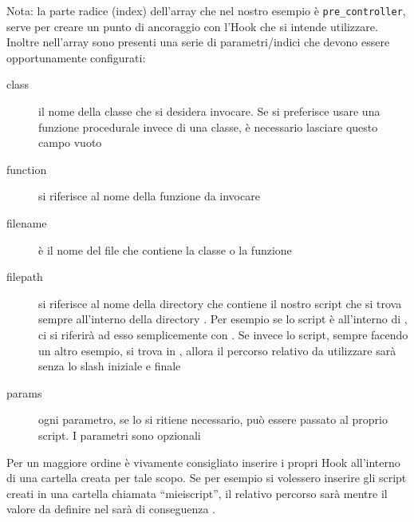                                
Nota: la parte radice (index) dell'array che nel nostro esempio è \verb|pre_controller|, serve per creare un punto di ancoraggio con l'Hook che si intende utilizzare. Inoltre nell'array sono presenti una serie di parametri/indici che devono essere opportunamente configurati:

\begin{description}
\item[class] il nome della classe che si desidera invocare. Se si preferisce usare una funzione procedurale invece di una classe, è necessario lasciare questo campo vuoto
\item[function] si riferisce al nome della funzione da invocare
\item[filename] è il nome del file che contiene la classe o la funzione
\item[filepath] si riferisce al nome della directory che contiene il nostro script che si trova sempre all'interno della directory . Per esempio se lo script è all'interno di , ci si riferirà ad esso semplicemente con . Se invece lo script, sempre facendo un altro esempio, si trova in , allora il percorso relativo da utilizzare sarà  senza lo slash \var{/} iniziale e finale
\item[params] ogni parametro, se lo si ritiene necessario, può essere passato al proprio script. I parametri sono opzionali
\end{description}

Per un maggiore ordine è vivamente consigliato inserire i propri Hook all'interno di una cartella creata per tale scopo. Se per esempio si volessero inserire gli script creati in una cartella chiamata ``mieiscript'', il relativo percorso sarà  mentre il valore da definire nel  sarà di conseguenza .

